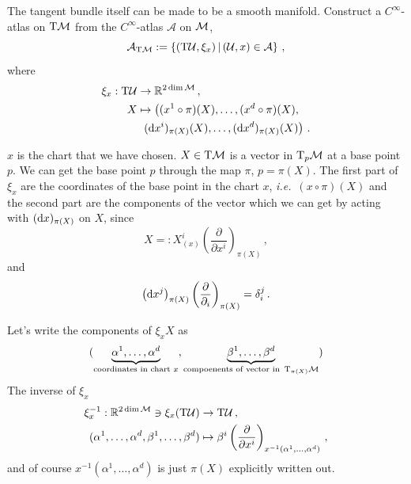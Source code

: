 \documentclass[11pt, a4paper, twocolumn]{article} %
\begin{document}
\begin{defn}
The tangent bundle itself can be made to be a smooth manifold.
Construct a $C^\infty$-atlas on $\T\M$ from the $C^\infty$-atlas $\mathcal{A}$ on $\mathcal{M}$,
\begin{equation}
    \mathcal{A}_{\T\M} := \left\{ (\T\mathcal{U}, \xi_x) \,|\, (\mathcal{U},x)\in\mathcal{A} \right\}\,,
\end{equation}
where
\begin{align}
    \xi_x: \T\mathcal{U} &\to \mathbb{R}^{2\dim \M}\,,\\
    X &\mapsto \left( (x^1\circ\pi)(X), \ldots, (x^d\circ\pi)(X), \right. \nonumber \\
    &~ \left.(\diff x^i)_{\pi(X)}(X), \ldots, 
    (\diff x^d)_{\pi(X)} (X)\right)\,.
\end{align}
\end{defn}
\begin{note}
    $x$ is the chart that we have chosen.
    $X \in \T\M$ is a vector in $\T_p\M$ at a base point $p$.
    We can get the base point $p$ through the map $\pi$, $p = \pi(X)$.
    The first part of $\xi_x$ are the coordinates of the base point in the chart $x$, \textit{i.e.}\ $(x\circ\pi)(X)$
    and the second part are the components of the vector which we can get by acting with $(\operatorname{d\!} x)_{\pi(X)}$ on $X$,
    since
    \begin{equation}
        X =: X^i_{(x)} \left( \frac{\partial}{\partial x^i} \right)_{\pi(X)}\,,
    \end{equation}
    and
    \begin{equation}
        \left( \operatorname{d\!} x^j \right)_{\pi(X)} \left( \frac{\partial}{\partial_i} \right)_{\pi(X)} = \delta^j_i\,.
    \end{equation}
\end{note}
Let's write the components of $\xi_x{X}$ as
\begin{equation}
    (\underbrace{\alpha^1, \ldots, \alpha^d}_{\text{coordinates in chart }x},
    \underbrace{\beta^1,\ldots,\beta^d}_{\text{compoenents of vector in }\T_{\pi(X)}\M})
\end{equation}
The inverse of $\xi_x$
\begin{align}
    \xi_x^{-1}: \mathbb{R}^{2\dim\M} \ni \xi_x(\T\mathcal{U}) &\to \T\mathcal{U}\,,\\
    (\alpha^1,\ldots,\alpha^d,\beta^1,\ldots,\beta^d) &\mapsto \beta^i \left( \frac{\partial}{\partial x^i} \right)_{x^{-1}(\alpha^1,\ldots,\alpha^d)}\,,
    \label{eq:xiTangentBundle}
\end{align}
and of course $x^{-1}(\alpha^1,\ldots,\alpha^d)$ is just $\pi(X)$ explicitly written out.
\end{document}
